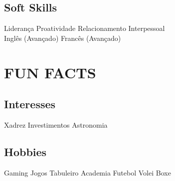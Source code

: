 \documentclass[]{deedy-resume-openfont}
\begin{document}
\begin{minipage}[t]{0.33\textwidth}
\sectionsep
\subsection{Soft Skills}
Liderança \textbullet{} Proatividade \textbullet{} Relacionamento Interpessoal \\Inglês (Avançado) \textbullet{} Francês (Avançado)
\sectionsep


\section{FUN FACTS}
\subsection{Interesses}
Xadrez \textbullet{} Investimentos \textbullet{} Astronomia
\sectionsep
\subsection{Hobbies}
Gaming \textbullet{} Jogos Tabuleiro \textbullet{} Academia \textbullet{} Futebol \textbullet{} Volei \textbullet{} Boxe
\sectionsep


%
%

\end{minipage} 
\hfill
\end{document}
